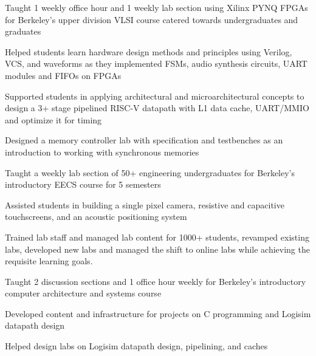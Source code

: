 \documentclass[]{deedy-resume-openfont}
\begin{document}
\vspace{\topsep} %
\begin{tightemize}
\item Taught 1 weekly office hour and 1 weekly lab section using Xilinx PYNQ FPGAs for Berkeley's upper division VLSI course catered towards undergraduates and graduates
\item Helped students learn hardware design methods and principles using Verilog, VCS, and waveforms as they implemented FSMs, audio synthesis circuits, UART modules and FIFOs on FPGAs
\item Supported students in applying architectural and microarchitectural concepts to design a 3+ stage pipelined RISC-V datapath with L1 data cache, UART/MMIO and optimize it for timing
\item Designed a memory controller lab with specification and testbenches as an introduction to working with synchronous memories
\end{tightemize}
\sectionsep

\vspace{\topsep} %
\begin{tightemize}
\item Taught a weekly lab section of 50+ engineering undergraduates for Berkeley's introductory EECS course for 5 semesters
\item Assisted students in building a single pixel camera, resistive and capacitive touchscreens, and an acoustic positioning system
\item Trained lab staff and managed lab content for 1000+ students, revamped existing labs, developed new labs and managed the shift to online labs while achieving the requisite learning goals. 
\end{tightemize}
\sectionsep

\vspace{\topsep} %
\begin{tightemize}
\item Taught 2 discussion sections and 1 office hour weekly for Berkeley's introductory computer architecture and systems course
\item Developed content and infrastructure for projects on C programming and Logisim datapath design
\item Helped design labs on Logisim datapath design, pipelining, and caches
\end{tightemize}
\sectionsep
\end{document}
